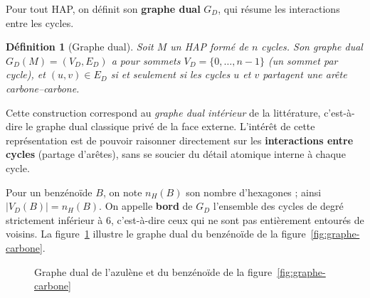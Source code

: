 \documentclass[11pt,a4paper]{article}
\newcommand{\GD}{\ensuremath{G_D}}                 %
\newtheorem{definition}{Définition}
\begin{document}
Pour tout HAP, on
définit son \textbf{graphe dual} $\GD$, qui résume les interactions entre les cycles.

\begin{definition}[Graphe dual]
Soit $M$ un HAP formé de $n$ cycles. Son graphe dual $\GD(M) = (V_D, E_D)$
a pour sommets $V_D = \{0, \dots, n-1\}$ (un sommet par cycle), et
$(u, v) \in E_D$ si et seulement si les cycles $u$ et $v$ partagent une
arête carbone--carbone.
\end{definition}

Cette construction correspond au \emph{graphe dual intérieur} de la
littérature, c'est-à-dire le graphe dual classique privé de la face
externe. L'intérêt de cette représentation est de pouvoir raisonner
directement sur les \textbf{interactions entre cycles} (partage
d'arêtes), sans se soucier du détail atomique interne à chaque cycle.

Pour un benzénoïde $B$, on note $n_H(B)$ son nombre d'hexagones ; ainsi
$|V_D(B)| = n_H(B)$. On appelle \textbf{bord} de $\GD$ l'ensemble des
cycles de degré strictement inférieur à $6$, c'est-à-dire ceux qui ne
sont pas entièrement entourés de voisins. La figure~\ref{fig:dual}
illustre le graphe dual du benzénoïde de la
figure~\ref{fig:graphe-carbone}.

\begin{figure}[h]
\centering
{}
\hspace{1.2cm}
\caption{Graphe dual de l'azulène et du benzénoïde de la figure~\ref{fig:graphe-carbone}}
\label{fig:dual}
\end{figure}
\end{document}
